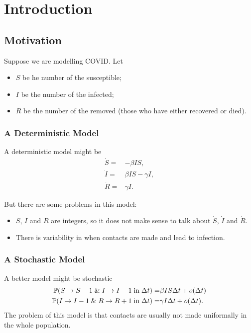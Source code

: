 \chapter{Introduction}

\section{Motivation}

Suppose we are modelling COVID. Let 
\begin{itemize}
    \item \textcolor{myblue}{$S$ be he number of the susceptible;}
    \item \textcolor{myblue}{$I$ be the number of the infected;}
    \item \textcolor{myblue}{$R$ be the number of the removed (those who have either recovered or died).}
\end{itemize}

\subsection{A Deterministic Model}

\textcolor{myblue}{
    A deterministic model might be
    \begin{align*}
        \dot{S} = & - \beta I S, \\ 
        \dot{I} = & \beta I S - \gamma I, \\ 
        \dot{R} = & \gamma I.
    \end{align*}
}
\textcolor{myorange}{
    But there are some problems in this model:
    \begin{itemize}
        \item $S$, $I$ and $R$ are integers, so it does not make sense to talk about $\dot{S}$, $\dot{I}$ and $\dot{R}$. 
        \item There is variability in when contacts are made and lead to infection.
    \end{itemize}
}

\subsection{A Stochastic Model}

A better model might be \textcolor{myblue}{stochastic
    \begin{align*}
        \prob{S \to S-1 \; \& \; I \to I-1 \; \text{in} \; \Delta t} = &\beta I S \Delta t + o(\Delta t) \\ 
        \prob{I \to I-1 \; \& \; R \to R+1 \; \text{in} \; \Delta t} = & \gamma I \Delta t + o(\Delta t).
    \end{align*}
}
\textcolor{myorange}{The problem of this model is that contacts are usually not made uniformally in the whole population.}

